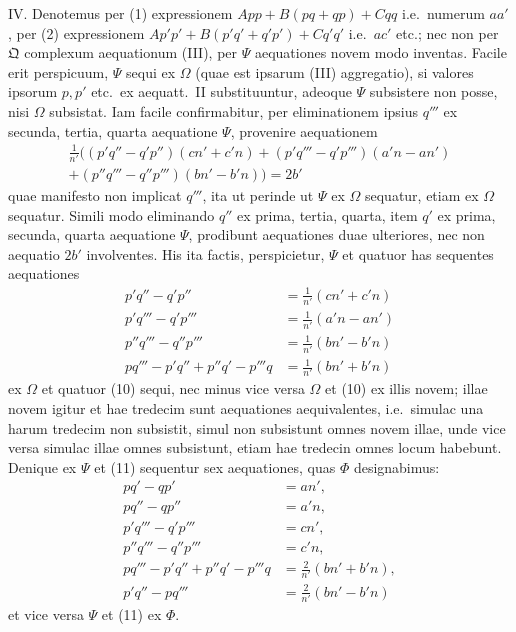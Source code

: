 \documentclass[12pt,a4paper]{article}
\theoremstyle{plain}
\theoremstyle{definition}
\theoremstyle{remark}
\begin{document}
IV. Denotemus per (1) expressionem $App + B(pq + qp) + Cqq$ i.e.\ numerum $aa'$, per (2) expressionem $Ap'p' + B(p'q' + q'p') + Cq'q'$ i.e.\ $ac'$ etc.; nec non per $\mathfrak{Q}$ complexum aequationum (III), per $\Psi$ aequationes novem modo inventas. Facile erit perspicuum, $\Psi$ sequi ex $\Omega$ (quae est ipsarum (III) aggregatio), si valores ipsorum $p, p'$ etc.\ ex aequatt.\ II substituuntur, adeoque $\Psi$ subsistere non posse, nisi $\Omega$ subsistat. Iam facile confirmabitur, per eliminationem ipsius $q'''$ ex secunda, tertia, quarta aequatione $\Psi$, provenire aequationem
\begin{multline*}
\tfrac{1}{n'}\bigl((p'q'' - q'p'')(cn' + c'n) + (p'q''' - q'p''')(a'n - an')\\
+ (p''q''' - q''p''')(bn' - b'n)\bigr) = 2b'\tag{10}
\end{multline*}
quae manifesto non implicat $q'''$, ita ut perinde ut $\Psi$ ex $\Omega$ sequatur, etiam ex $\Omega$ sequatur. Simili modo eliminando $q''$ ex prima, tertia, quarta, item $q'$ ex prima, secunda, quarta aequatione $\Psi$, prodibunt aequationes duae ulteriores, nec non aequatio $2b'$ involventes. His ita factis, perspicietur, $\Psi$ et quatuor has sequentes aequationes
\begin{align*}
p'q'' - q'p'' &= \tfrac{1}{n'}(cn' + c'n) \\
p'q''' - q'p''' &= \tfrac{1}{n'}(a'n - an') \\
p''q''' - q''p''' &= \tfrac{1}{n'}(bn' - b'n) \\
pq''' - p'q'' + p''q' - p'''q &= \tfrac{1}{n'}(bn' + b'n)\tag{11}
\end{align*}
ex $\Omega$ et quatuor (10) sequi, nec minus vice versa $\Omega$ et (10) ex illis novem; illae novem igitur et hae tredecim sunt aequationes aequivalentes, i.e.\ simulac una harum tredecim non subsistit, simul non subsistunt omnes novem illae, unde vice versa simulac illae omnes subsistunt, etiam hae tredecin omnes locum habebunt. Denique ex $\Psi$ et (11) sequentur sex aequationes, quas $\Phi$ designabimus:
\begin{align*}
pq' - qp' &= an', \\
pq'' - qp'' &= a'n, \\
p'q''' - q'p''' &= cn', \\
p''q''' - q''p''' &= c'n, \\
pq''' - p'q'' + p''q' - p'''q &= \tfrac{2}{n'}(bn' + b'n), \\
p'q'' - pq''' &= \tfrac{2}{n'}(bn' - b'n)
\end{align*}
et vice versa $\Psi$ et (11) ex $\Phi$.
\end{document}
